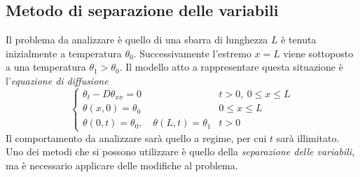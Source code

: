\documentclass[a4paper,12pt, draft]{article}
\theoremstyle{break}
\numberwithin{equation}{section}
\begin{document}
\subsection{Metodo di separazione delle variabili}
Il problema da analizzare è quello di una sbarra di lunghezza $L$ è tenuta inizialmente a temperatura $\theta_0$. Successivamente l'estremo $x = L$ viene sottoposto a una temperatura $\theta_1 > \theta_0$. Il modello atto a rappresentare questa situazione è l'\emph{equazione di diffusione}
$$
\begin{cases}
\theta_t -D \theta_{xx} = 0 & t > 0,\ 0 \leq x \leq L\\
\theta(x, 0) = \theta_0  & 0 \leq x \leq L\\
\theta(0,t) = \theta_0, \quad \theta(L,t)=\theta_1 & t >0
\end{cases}
$$
Il comportamento da analizzare sarà quello a regime, per cui $t$ sarà illimitato. Uno dei metodi che si possono utilizzare è quello della \emph{separazione delle variabili}, ma è necessario applicare delle modifiche al problema.
\end{document}
